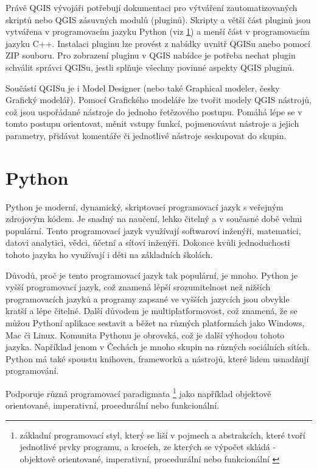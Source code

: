Právě QGIS vývojáři potřebují dokumentaci pro výtváření zautomatizovaných skriptů nebo QGIS zásuvných modulů (pluginů).
Skripty a větší část pluginů jsou vytvářena v programovacím jazyku Python (viz \ref{section-python})
a menší část v programovacím jazyku C++. Instalaci pluginu lze provést z nabídky uvnitř QGISu
anebo pomocí ZIP souboru. Pro zobrazení pluginu v QGIS nabídce je potřeba nechat plugin
schválit správci QGISu, jestli splňuje všechny povinné aspekty QGIS pluginů.

Součástí QGISu je i Model Designer (nebo také Graphical modeler, česky Grafický modelář).
Pomocí Grafického modeláře lze tvořit modely QGIS nástrojů, což jsou uspořádané nástroje do jednoho řetězového postupu.
Pomáhá lépe se v tomto postupu orientovat, měnit vstupy funkcí, pojmenovávat nástroje a jejich parametry,
přidávat komentáře či jednotlivé nástroje seskupovat do skupin. 

\section{Python}
\label{section-python}
Python je moderní, dynamický, skriptovací programovací jazyk s veřejným zdrojovým kódem. 
Je snadný na naučení, lehko čitelný a v současné době velmi populární. Tento programovací jazyk využívají
softwaroví inženýři, matematici, datovi analytici, vědci, účetní a síťoví inženýři.
Dokonce kvůli jednoduchosti tohoto jazyka ho využívají i děti na základních školách.

Důvodů, proč je tento programovací jazyk tak populární, je mnoho. Python je vyšší programovací jazyk,
což znamená lépší srozumitelnost než nižších programovacích jazyků a programy zapsané
ve vyšších jazycích jsou obvykle kratší a lépe čitelné.  Další důvodem je multiplatformovost,
což znamená, že se můžou Pythoní aplikace sestavit a běžet na různých platformách jako 
Windows, Mac či Linux. Komunita Pythonu je obrovská, což je další výhodou tohoto jazyka.
Například jenom v Čechách je mnoho skupin na různých sociálních sítích.
Python má také spoustu knihoven, frameworků a nástrojů, které lidem usnadňují programování.

Podporuje různá programovací paradigmata
\footnote{základní programovací styl, který se liší v pojmech a abstrakcích,
které tvoří jednotlivé prvky programu, a krocích, ze kterých se výpočet skládá  
- objektově orientované, imperativní, procedurální nebo funkcionální \cite{wikipedia-paradigma}} 
jako například objektově orientované, imperativní, procedurální nebo funkcionální.

